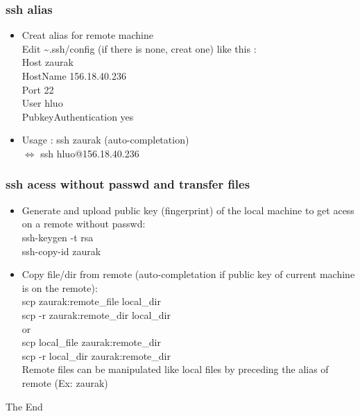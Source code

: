 \documentclass{beamer}
\begin{document}


\begin{frame}
\frametitle{ssh alias}
\begin{itemize}
	\item Creat alias for remote machine \\
	      Edit \~\thinspace .ssh/config (if there is none, creat one) like this :\\
	      Host zaurak \\
	      	HostName 156.18.40.236 \\
	  	Port 22 \\
		User hluo \\ 
		PubkeyAuthentication yes \\
	\item Usage : ssh zaurak (auto-completation) \\
		$\iff$ ssh hluo@156.18.40.236
\end{itemize}
\end{frame}

\begin{frame}
\frametitle{ssh acess without passwd and transfer files}
\begin{itemize}
	\item Generate and upload public key (fingerprint) of the local machine to get acess on a remote without passwd:\\
	          ssh-keygen -t rsa \\
		  ssh-copy-id zaurak
		  
	\item Copy file/dir from remote (auto-completation if public key of current machine is on the remote): \\
			scp zaurak:remote\_file local\_dir \\
			scp -r zaurak:remote\_dir local\_dir \\
			or \\
			scp local\_file zaurak:remote\_dir \\
			scp -r local\_dir zaurak:remote\_dir \\
			Remote files can be manipulated like local files by preceding the alias of remote (Ex: zaurak)
\end{itemize}
\end{frame}


\begin{frame}
\Huge{\centerline{The End}}
\end{frame}

\end{document}
